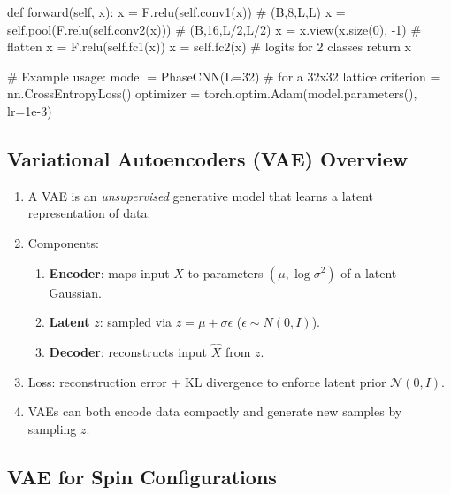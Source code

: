 \documentclass[%
oneside,                 %
final,                   %
10pt]{article}
\begin{document}
   def forward(self, x):
       x = F.relu(self.conv1(x))      # (B,8,L,L)
       x = self.pool(F.relu(self.conv2(x)))  # (B,16,L/2,L/2)
       x = x.view(x.size(0), -1)      # flatten
       x = F.relu(self.fc1(x))
       x = self.fc2(x)               # logits for 2 classes
       return x

# Example usage:
model = PhaseCNN(L=32)           # for a 32x32 lattice
criterion = nn.CrossEntropyLoss()
optimizer = torch.optim.Adam(model.parameters(), lr=1e-3)

\epycod


\subsection{Variational Autoencoders (VAE) Overview}

\begin{enumerate}
\item A VAE is an \emph{unsupervised} generative model that learns a latent representation of data.

\item Components:
\begin{enumerate}

  \item \textbf{Encoder}: maps input $X$ to parameters $(\mu, \log\sigma^2)$ of a latent Gaussian.

  \item \textbf{Latent} $z$: sampled via $z = \mu + \sigma \epsilon$ ($\epsilon\sim N(0,I)$).

  \item \textbf{Decoder}: reconstructs input $\hat{X}$ from $z$.

\end{enumerate}

\noindent
\item Loss: reconstruction error + KL divergence to enforce latent prior $\mathcal{N}(0,I)$.

\item VAEs can both encode data compactly and generate new samples by sampling $z$.
\end{enumerate}

\noindent
\subsection{VAE for Spin Configurations}
\end{document}
